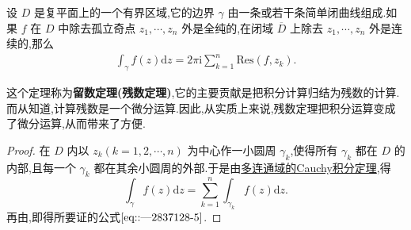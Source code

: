 \documentclass[../../main.tex]{subfiles}
\begin{document}
\begin{theorem}\label{theorem:留数定理(残数定理)-定理5.4.9}
设 \( D \) 是复平面上的一个有界区域,它的边界 \( \gamma \) 由一条或若干条简单闭曲线组成.如果 \( f \) 在 \( D \) 中除去孤立奇点 \( z_1, \cdots, z_n \) 外是全纯的,在闭域 \( \overline{D} \) 上除去 \( z_1, \cdots, z_n \) 外是连续的,那么
\begin{align}
\int_{\gamma} f(z) \mathrm{d}z = 2\pi \mathrm{i} \sum_{k = 1}^{n} \mathrm{Res}(f, z_k).\label{eq::---2837128-5}
\end{align}
\end{theorem}
\begin{remark}
这个定理称为\textbf{留数定理(残数定理)},它的主要贡献是把积分计算归结为残数的计算.而从知道,计算残数是一个微分运算.因此,从实质上来说,残数定理把积分运算变成了微分运算,从而带来了方便.
\end{remark}
\begin{proof}
在 \( D \) 内以 \( z_k (k = 1, 2, \cdots, n) \) 为中心作一小圆周 \( \gamma_k \),使得所有 \( \gamma_k \) 都在 \( D \) 的内部,且每一个 \( \gamma_k \) 都在其余小圆周的外部.于是由\hyperref[theorem:定理3.2.5]{多连通域的Cauchy积分定理},得
\[
\int_{\gamma} f(z) \mathrm{d}z = \sum_{k = 1}^{n} \int_{\gamma_k} f(z) \mathrm{d}z.
\]
再由,即得所要证的公式\(\eqref{eq::---2837128-5}\).

\end{proof}
\end{document}

